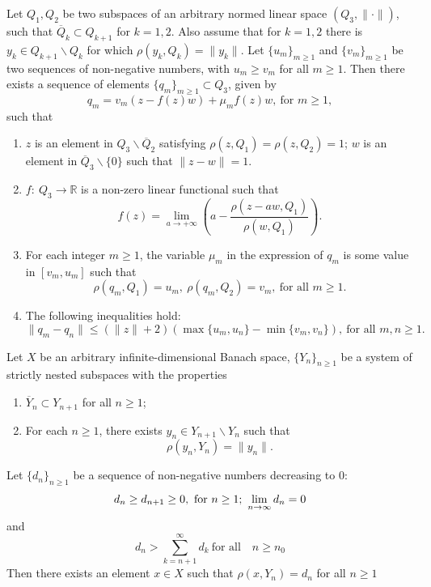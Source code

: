 \documentclass[10pt,a4paper]{amsart}
\begin{document}
 \begin{lemma}
 \label{lemma2}
 Let $Q_1,Q_2$ be two subspaces of an arbitrary normed linear space $(Q_3,\|\cdot\|)$, such that $\overline Q_k\subset Q_{k+1}$ for $k=1,2$. Also assume that for $k=1,2$ there is $y_k\in Q_{k+1}\backslash  Q_k$ for which $\rho(y_k,Q_k)=\|y_k\|$. Let $\{u_m\}_{m\ge1}$ and $\{v_m\}_{m\ge1}$ be two sequences of non-negative numbers, with $u_m\ge v_m$ for all $m\ge1$. Then there exists a sequence of elements  $\{q_m\}_{m\ge1}\subset Q_{3}$, given by
$$
q_{m}=v_m(z-f(z)w)+\mu_mf(z)w,~\mbox{for $m\ge1$},
$$
such that
\begin{enumerate}
\renewcommand{\labelenumi}{\alph{enumi})}
\item [(i)]$z$ is an element in $Q_3\backslash \overline Q_2$ satisfying $\rho(z,Q_1)=\rho(z,Q_2)=1$; $w$ is an element in $\overline Q_3\backslash\{0\}$ such that $\|z-w\|=1$.
    \item[(ii)] $f:~Q_3\rightarrow \mathbb R$ is a non-zero linear functional such that 
    $$
    f(z)=\lim_{a\to+\infty}\left(a-\frac{\rho(z-aw,Q_1)}{\rho(w,Q_1)}\right).
    $$
    \item[(iii)] For each integer $m\ge1$, the variable $\mu_m$ in the expression of $q_m$ is some value in $[v_m,u_m]$ such that
     \begin{equation}
 \label{q}
 \rho(q_m,Q_1)=u_m,~\rho(q_m,Q_2)=v_m,~\mbox{for all $m\ge1$}.
 \end{equation}
    \item[(iv)] The following inequalities hold:
 \begin{equation}
 \label{diffq1}
 \|q_m-q_n\|\le (\|z\|+2)\left(\max\{u_m,u_n\}-\min\{v_m,v_n\}\right),~\mbox{for all $m,n\ge1$}.
 \end{equation}
\end{enumerate}
 \end{lemma}

\begin{theorem} \label{Borodin}
Let $X$ be an arbitrary infinite-dimensional Banach space, $\{Y_n\}_{n\ge1}$ be a system of strictly nested subspaces with the properties
\begin{enumerate}
\item $\overline Y_n \subset Y_{n+1}$ for all $n\ge1$;
\item For each $n\ge1$, there exists $y_n\in Y_{n+1}\backslash Y_n$ such that
\begin{equation}
\label{Yn}
\rho(y_n,Y_n)=\|y_n\|.
\end{equation}
 \end{enumerate}
 Let  $\{d_n\}_{n\ge1}$ be a sequence of non-negative numbers  decreasing to $0$:
 \begin{equation}
\label{condition'}
 d_n\geq d_{n+1}\ge0, \,\,\mbox{for}~ n \ge 1;~\lim_{n\to\infty}d_n=0 \\
 \end{equation}
 and  $$ d_n > \sum_{k = n+1}^\infty d_k~\mbox{for all}\quad n \ge n_0$$
 Then there exists an element $x\in X$ such that $\rho(x,Y_n)=d_n$ for all $n\ge1$ 
\end{theorem}
\end{document}
